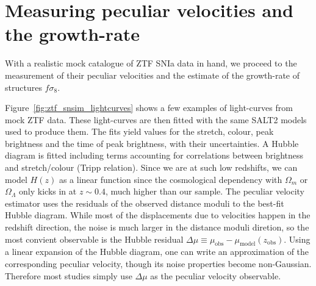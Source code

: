 \section{Measuring peculiar velocities and the growth-rate}
\label{velocities:ztf_fs8:measurements}

With a realistic mock catalogue of ZTF SNIa data in hand, we proceed to the measurement of 
their peculiar velocities and the estimate of the growth-rate of structures $f\sigma_8$. 

Figure~\ref{fig:ztf_snsim_lightcurves} shows a few examples of light-curves from mock ZTF data.
These light-curves are then fitted with the same SALT2 models used to produce them. 
The fits yield values for the stretch, colour, peak brightness and the time of peak brightness, 
with their uncertainties. 
A Hubble diagram is fitted including terms accounting for correlations between brightness and 
stretch/colour (Tripp relation). 
Since we are at such low redshifts, we can model $H(z)$ as a linear function since 
the cosmological dependency with $\Omega_m$ or $\Omega_\Lambda$ only kicks in at $z \sim 0.4$, 
much higher than our sample. 
The peculiar velocity estimator uses the residuals of the observed distance moduli to the
best-fit Hubble diagram. While most of the displacements due to velocities happen in the redshift direction,
the noise is much larger in the distance moduli diretion, so the most convient observable is 
the Hubble residual $\Delta \mu \equiv \mu_\text{obs} - \mu_\text{model}(z_\text{obs})$. 
Using a linear expansion of the Hubble diagram, one can write an approximation of the corresponding 
peculiar velocity, though its noise properties become non-Gaussian. Therefore most studies 
simply use $\Delta \mu$ as the peculiar velocity observable. 


